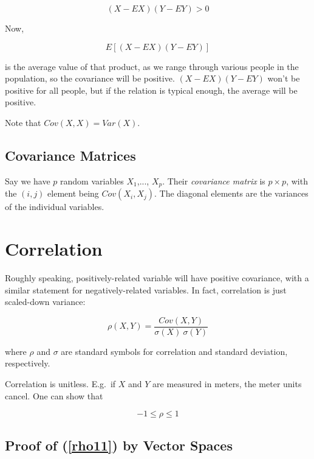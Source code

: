 \begin{equation}
(X - EX) (Y - EY) > 0
\end{equation}

Now, 

\begin{equation}
E[(X - EX) (Y - EY)]
\end{equation}

is the average value of that product, as we range through various people
in the population, so the covariance will be positive.  
$(X - EX) (Y - EY)$ won't be positive for all people, but if the
relation is typical enough, the average will be positive.

Note that $Cov(X,X) = Var(X)$.

\subsection{Covariance Matrices}

Say we have $p$ random variables $X_1$,..., $X_p$.  Their
\textit{covariance matrix} is $p \times p$, with the $(i,j)$
element being $Cov(X_i,X_j)$.  The diagonal elements are the variances
of the individual variables.

\section{Correlation}

Roughly speaking, positively-related variable will have
positive covariance, with a similar statement for negatively-related
variables.  In fact, correlation is just scaled-down variance:

\begin{equation}
\rho(X,Y) = 
\frac{Cov(X,Y)}{\sigma(X) ~ \sigma(Y)}
\end{equation}

where $\rho$ and $\sigma$ are standard symbols for correlation and
standard deviation, respectively.

Correlation is unitless.  E.g.\ if $X$ and $Y$ are measured in meters,
the meter units cancel.  One can show that 

\begin{equation}
\label{rho11}
-1 \leq \rho \leq 1
\end{equation}

\subsection{Proof of (\ref{rho11}) by Vector Spaces}

